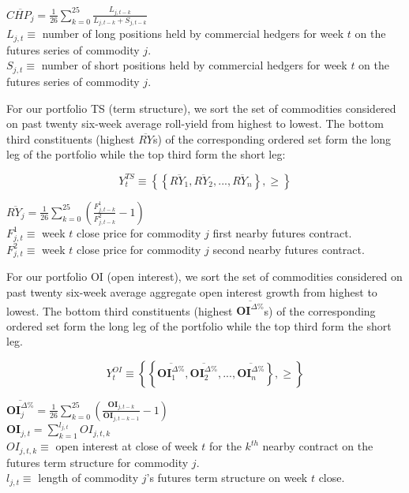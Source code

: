 \documentclass[12pt,]{article}
\begin{document}
\(\overline{CHP_{j}}=\frac{1}{26}\sum_{k=0}^{25}\frac{L_{j,t-k}}{L_{j,t-k}+S_{j,t-k}}\)\\
\(L_{j,t}\equiv\) number of long positions held by commercial hedgers
for week \(t\) on the futures series of commodity \(j\).\\
\(S_{j,t}\equiv\) number of short positions held by commercial hedgers
for week \(t\) on the futures series of commodity \(j\).

For our portfolio TS (term structure), we sort the set of commodities
considered on past twenty six-week average roll-yield from highest to
lowest. The bottom third constituents (highest \(\overline{RY}\)s) of
the corresponding ordered set form the long leg of the portfolio while
the top third form the short leg:

\[Y_{t}^{TS}\equiv\left \{ \left \{ \overline{RY_{1}}, \overline{RY_{2}}, ..., \overline{RY_{n}} \right \}, \geq \right \}\]

\(\overline{RY_{j}}=\frac{1}{26}\sum_{k=0}^{25}(\frac{F_{j,t-k}^{1}}{F_{j,t-k}^{2}} - 1)\)\\
\(F_{j,t}^{1}\equiv\) week \(t\) close price for commodity \(j\) first
nearby futures contract.\\
\(F_{j,t}^{2}\equiv\) week \(t\) close price for commodity \(j\) second
nearby futures contract.

For our portfolio OI (open interest), we sort the set of commodities
considered on past twenty six-week average aggregate open interest
growth from highest to lowest. The bottom third constituents (highest
\(\overline{\mathbf{OI}^{\Delta \%}}\)s) of the corresponding ordered
set form the long leg of the portfolio while the top third form the
short leg.

\[Y_{t}^{OI}\equiv\left \{ \left \{ \overline{\mathbf{OI}_{1}^{\Delta \%}}, \overline{\mathbf{OI}_{2}^{\Delta \%}}, ..., \overline{\mathbf{OI}_{n}^{\Delta \%}} \right \}, \geq \right \}\]

\(\overline{\mathbf{OI}_{j}^{\Delta \%}}=\frac{1}{26}\sum_{k=0}^{25}(\frac{\mathbf{OI}_{j,t-k}}{\mathbf{OI}_{j,t-k-1}} - 1)\)\\
\(\mathbf{OI}_{j,t}=\sum_{k=1}^{l_{j,t}}OI_{j,t,k}\)\\
\(OI_{j,t,k}\equiv\) open interest at close of week \(t\) for the
\(k^{th}\) nearby contract on the futures term structure for commodity
\(j\).\\
\(l_{j,t}\equiv\) length of commodity \(j\)'s futures term structure on
week \(t\) close.
\end{document}
